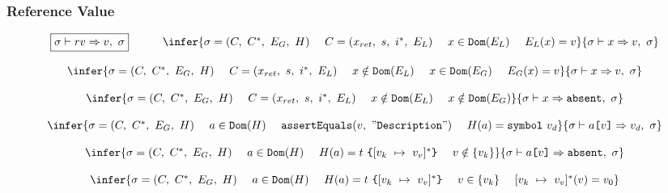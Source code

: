 \documentclass[11pt]{article}
\newcommand{\Term}[1]{\texttt{#1}}
\newcommand{\cs}[0]{\quad}
\newcommand{\symstate}[0]{\sigma}
\newcommand{\symctx}[0]{C}
\newcommand{\symctxstack}[0]{C^*}
\newcommand{\symenv}[0]{E}
\newcommand{\symheap}[0]{H}
\newcommand{\symrefv}[0]{rv}
\newcommand{\symstatetuple}[4]{(#1,\ #2,\ #3,\ #4)}
\newcommand{\symctxtuple}[4]{(#1,\ #2,\ #3,\ #4)}
\newcommand{\evalrefv}[4]{#1 \vdash #2 \Rightarrow #3,\ #4}
\begin{document}
\subsubsection{Reference Value}
\[
\begin{array}{c}
\multicolumn{1}{c}{\begin{array}{ccc}
\fbox{$\evalrefv{\symstate}{\symrefv}{v}{\symstate}$}
& \cs &
\infer
{\symstate = \symstatetuple{\symctx}{\symctxstack}{\symenv_G}{\symheap} \ \ \ \
\symctx = \symctxtuple{x_{ret}}{s}{i^*}{\symenv_L}\ \ \ \
x \in \Term{Dom}(\symenv_L)\ \ \ \
\symenv_L (x) = v }
{\evalrefv{\symstate}{x}{v}{\symstate}}
\end{array}}
\\ \\
\infer
{\symstate = \symstatetuple{\symctx}{\symctxstack}{\symenv_G}{\symheap} \ \ \ \
\symctx = \symctxtuple{x_{ret}}{s}{i^*}{\symenv_L}\ \ \ \
x \notin \Term{Dom}(\symenv_L)\ \ \ \
x \in \Term{Dom}(\symenv_G)\ \ \ \
\symenv_G (x) = v }
{\evalrefv{\symstate}{x}{v}{\symstate}}
\\ \\
\infer
{\symstate = \symstatetuple{\symctx}{\symctxstack}{\symenv_G}{\symheap} \ \ \ \
\symctx = \symctxtuple{x_{ret}}{s}{i^*}{\symenv_L}\ \ \ \
x \notin \Term{Dom}(\symenv_L)\ \ \ \
x \notin \Term{Dom}(\symenv_G)}
{\evalrefv{\symstate}{x}{\Term{absent}}{\symstate}}
\\ \\
\infer
{\symstate = \symstatetuple{\symctx}{\symctxstack}{\symenv_G}{\symheap} \ \ \ \
a \in \Term{Dom}(\symheap)\ \ \ \
\Term{assertEquals}(v,\ "\Term{Description}")\ \ \ \
\symheap(a) = \Term{symbol}\ v_d}
{\evalrefv{\symstate}{a\Term{[} v \Term{]}}{v_d}{\symstate}}
\\ \\
\infer
{\symstate = \symstatetuple{\symctx}{\symctxstack}{\symenv_G}{\symheap} \ \ \ \
a \in \Term{Dom}(\symheap)\ \ \ \
\symheap(a) = t\ \Term{\{} [v_k\ \mapsto\ v_v]^* \Term{\}} \ \ \ \
v \notin \{ v_k \}}
{\evalrefv{\symstate}{a\Term{[} v \Term{]}}{\Term{absent}}{\symstate}}
\\ \\
\infer
{\symstate = \symstatetuple{\symctx}{\symctxstack}{\symenv_G}{\symheap} \ \ \ \
a \in \Term{Dom}(\symheap)\ \ \ \
\symheap(a) = t\ \Term{\{} [v_k\ \mapsto\ v_v]^* \Term{\}} \ \ \ \
v \in \{ v_k \} \ \ \ \
[v_k\ \mapsto\ v_v]^*(v) = v_0 }

\end{array}\]
\end{document}
